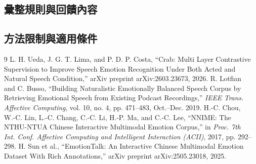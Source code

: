 
\subsection{彙整規則與回饋內容}

\begin{samepage}
\section{方法限制與適用條件}

\end{samepage}

\begingroup
\let\chapter\section
\begin{thebibliography}{9}
 L. H. Ueda, J. G. T. Lima, and P. D. P. Costa,
``Crab: Multi Layer Contrastive Supervision to Improve Speech Emotion Recognition Under Both Acted and Natural Speech Condition,''
arXiv preprint arXiv:2603.23673, 2026.
 R. Lotfian and C. Busso,
``Building Naturalistic Emotionally Balanced Speech Corpus by Retrieving Emotional Speech from Existing Podcast Recordings,''
\textit{IEEE Trans. Affective Computing}, vol. 10, no. 4, pp. 471--483, Oct.--Dec. 2019.
 H.-C. Chou, W.-C. Lin, L.-C. Chang, C.-C. Li, H.-P. Ma, and C.-C. Lee,
``NNIME: The NTHU-NTUA Chinese Interactive Multimodal Emotion Corpus,''
in \textit{Proc. 7th Int. Conf. Affective Computing and Intelligent Interaction (ACII)}, 2017, pp. 292--298.
 H. Sun et al.,
``EmotionTalk: An Interactive Chinese Multimodal Emotion Dataset With Rich Annotations,''
arXiv preprint arXiv:2505.23018, 2025.
\end{thebibliography}
\endgroup
{}
